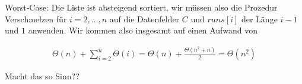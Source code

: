 \begin{solution}
\begin{enumerate}[label = (\alph*)]
    Worst-Case: Die Liste ist absteigend sortiert, wir müssen also die Prozedur Verschmelzen für $i = 2,\dots,n$ auf die Datenfelder $C$ und $runs[i]$ der Länge $i-1$ und $1$ anwenden. Wir kommen also insgesamt auf einen Aufwand von

    \begin{align*}
      \Theta(n) + \sum_{i=2}^{n} \Theta(i) = \Theta(n) + \frac{\Theta(n^2+n)}{2} = \Theta(n^2)
    \end{align*}

    Macht das so Sinn??

\end{enumerate}
\end{solution}


